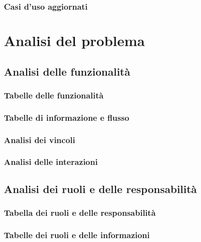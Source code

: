 \documentclass{article}
\begin{document}
\subsubsection{\Large Casi d'uso aggiornati}



\pagebreak
\section{\Large Analisi del problema}
\subsection{\Large Analisi delle funzionalità}
\subsubsection{\Large Tabelle delle funzionalità}

\subsubsection{\Large Tabelle di informazione e flusso}

\subsubsection{\Large Analisi dei vincoli}

\pagebreak
\subsubsection{\Large Analisi delle interazioni}


\subsection{\Large Analisi dei ruoli e delle responsabilità}
\subsubsection{\Large Tabella dei ruoli e delle responsabilità}

\subsubsection{\Large Tabelle dei ruoli e delle informazioni}

\pagebreak
\end{document}
